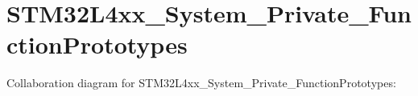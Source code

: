\hypertarget{group__STM32L4xx__System__Private__FunctionPrototypes}{}\section{S\+T\+M32\+L4xx\+\_\+\+System\+\_\+\+Private\+\_\+\+Function\+Prototypes}
\label{group__STM32L4xx__System__Private__FunctionPrototypes}
Collaboration diagram for S\+T\+M32\+L4xx\+\_\+\+System\+\_\+\+Private\+\_\+\+Function\+Prototypes\+:
